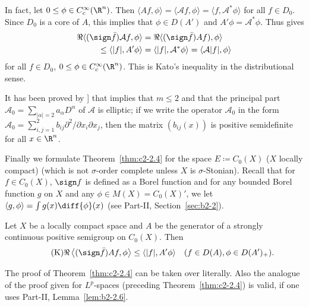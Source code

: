 In fact, let $0 \leq \phi \in C_{c}^{\infty}(\R^n)$.
Then $\langle Af,\phi \rangle = \langle \mathcal{A}f,\phi \rangle = \langle f,\mathcal{A}^{*}\phi \rangle$ for all $f \in D_{0}$.
Since $D_{0}$ is a core of\/ $A$, this implies that $\phi \in D(A')$ and $A'\phi = \mathcal{A}^{*}\phi$.
Thus   gives 
%
\begin{align*}
\Re\langle(\sign \bar{f})\mathcal{A}f,\phi \rangle &= \Re\langle(\sign \bar{f})Af),\phi \rangle \\
 \leq \langle |f|,A'\phi \rangle & = \langle |f|,\mathcal{A}^{*}\phi \rangle = \langle \mathcal{A}|f|,\phi \rangle
\end{align*}
%
for all $f \in D_{0}$, $0 \leq \phi \in C_{c}^{\infty}(\R^n)$.
This is Kato's inequality in the distributional sense.
\begin{remark*}\label{rem:c2-3.0}
It has been proved by \textcite{miyajimaokazawa:1984}] that  implies that $m \leq 2$ and that the principal part $\mathcal{A}_{0} = \sum_{|\alpha|=2} a_{\alpha} D^{\alpha}$ of\/ $\mathcal{A}$ is elliptic; \ie if we write the operator $\mathcal{A}_{0}$ in the form $\mathcal{A}_{0} = \sum_{i,j=1}^{2} b_{ij} \partial^{2}/\partial x_{i} \partial x_{j}$, then the matrix $(b_{ij}(x))$ is positive semidefinite for all $x \in \R^n$.
\end{remark*}
Finally we formulate Theorem~\ref{thm:c2-2.4}   for the space $E \coloneq C_{0}(X)$ ($X$ locally compact) (which is not $\sigma$-order complete unless $X$ is $\sigma$-Stonian).
Recall that for $f \in C_{0}(X)$, \mbox{$\sign f$} is defined as a Borel function and for any bounded Borel function $g$ on $X$ and any $\phi \in M(X) = C_{0}(X)'$, we let $\langle g,\phi \rangle = \int g(x) \diff{\phi}(x)$ (see Part-II, Section~\ref{sec:b2-2}).
\begin{theorem}\label{thm:c2-2.6}
%
Let $X$ be a locally compact space and $A$ be the generator of a strongly continuous positive semigroup on 
$C_{0}(X)$.
Then
\begin{equation*}\label{eq:c2-K-3} \tag{K}
\Re\left\langle(\sign \bar{f})Af,\phi \right\rangle \leq \langle |f|,A'\phi \rangle \quad (f \in D(A), \phi \in D(A')_{+}).
\end{equation*}
\end{theorem}
The proof of Theorem~\ref{thm:c2-2.4} can be taken over literally.
Also the analogue of the proof given for $L^p$-spaces (preceding Theorem~\ref{thm:c2-2.4})  is valid, if one uses Part-II, Lemma~\ref{lem:b2-2.6}.
